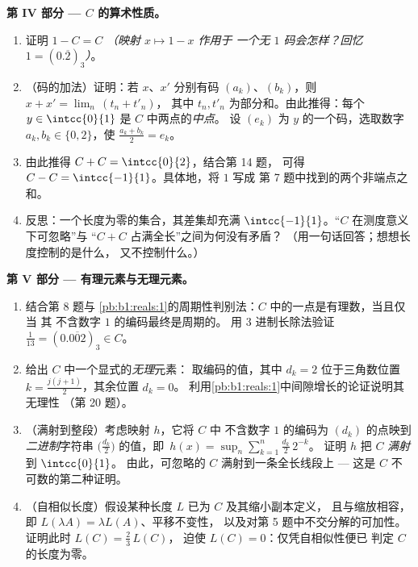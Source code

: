 \begin{problem}[{周末问题 --- 康托尔三分集：
长度为零、不可数、完备，且 $C + C =
\intcc{0}{2}$}]
\medskip
\noindent\textbf{第 IV 部分 --- $C$ 的算术性质。}
\begin{enumerate}[resume]
  \item 证明 $1 - C = C$ \emph{（映射 $x \mapsto 1 - x$ 作用于
        一个无 $1$ 码会怎样？回忆 $1 = (0.\overline{2})_3$）}。
  \item （码的加法）证明：若 $x$、$x'$ 分别有码
        $(a_k)$、$(b_k)$，则 $x + x' = \lim_n\,(t_n + t'_n)$，
        其中 $t_n, t'_n$ 为部分和。由此推得：每个 $y
        \in \intcc{0}{1}$ 是 $C$ 中两点的\emph{中点}。
        设 $(e_k)$ 为 $y$ 的一个码，选取数字
        $a_k, b_k \in \{0, 2\}$，使 $\frac{a_k + b_k}{2} =
        e_k$。
  \item 由此推得 $C + C = \intcc{0}{2}$，结合第 14 题，
        可得 $C - C = \intcc{-1}{1}$。具体地，将 $1$ 写成
        第 7 题中找到的两个非端点之和。
  \item 反思：一个长度为零的集合，其差集却充满
        $\intcc{-1}{1}$。“$C$ 在测度意义下可忽略”与
        “$C + C$ 占满全长”之间为何没有矛盾？
        （用一句话回答；想想长度控制的是什么，
        又不控制什么。）
\end{enumerate}

\medskip
\noindent\textbf{第 V 部分 --- 有理元素与无理元素。}
\begin{enumerate}[resume]
  \item 结合第 8 题与
        \cref{pb:b1:reals:1}的周期性判别法：$C$ 中的一点是有理数，当且仅当
        其 不含数字 $1$ 的编码最终是周期的。
        用 $3$ 进制长除法验证 $\frac1{13} =
        (0.\overline{002})_3 \in C$。
  \item 给出 $C$ 中一个显式的\emph{无理}元素：
        取编码的值，其中 $d_k = 2$ 位于三角数位置
        $k = \frac{j(j+1)}{2}$，其余位置 $d_k = 0$。
        利用\cref{pb:b1:reals:1}中间隙增长的论证说明其无理性
        （第 20 题）。
  \item （满射到整段）考虑映射 $h$，它将
        $C$ 中 不含数字 $1$ 的编码为 $(d_k)$ 的点映到
        \emph{二进制}字符串 $\bigl(\frac{d_k}2\bigr)$ 的值，即\
        $h(x) = \sup_n \sum_{k=1}^n \frac{d_k}{2}\,2^{-k}$。
        证明 $h$ 把 $C$ \emph{满射}到 $\intcc{0}{1}$。
        由此，可忽略的 $C$ 满射到一条全长线段上 ---
        这是 $C$ 不可数的第二种证明。
  \item （自相似长度）假设某种长度 $L$ 已为 $C$ 及其缩小副本定义，
        且与缩放相容，
        即 $L(\lambda A) = \lambda L(A)$、平移不变性，
        以及对第 5 题中不交分解的可加性。
        证明此时 $L(C) = \frac23\,L(C)$，
        迫使 $L(C) = 0$：仅凭自相似性便已
        判定 $C$ 的长度为零。
\end{enumerate}


\end{problem}
